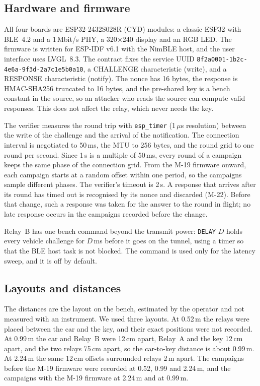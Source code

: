 \documentclass{ieeeaccess}
\begin{document}
\subsection{Hardware and firmware}

All four boards are ESP32-2432S028R (CYD) modules: a classic ESP32 with BLE~4.2 and a 1\,Mbit/s PHY, a 320$\times$240 display and an RGB LED. The firmware is written for ESP-IDF v6.1 with the NimBLE host, and the user interface uses LVGL~8.3. The contract fixes the service UUID \texttt{8f2a0001-1b2c-4e6a-9f3d-2a7c1e5b0a10}, a CHALLENGE characteristic (write), and a RESPONSE characteristic (notify). The nonce has 16 bytes, the response is HMAC-SHA256 truncated to 16 bytes, and the pre-shared key is a bench constant in the source, so an attacker who reads the source can compute valid responses. This does not affect the relay, which never needs the key.

The verifier measures the round trip with \texttt{esp\_timer} (1\,$\mu$s resolution) between the write of the challenge and the arrival of the notification. The connection interval is negotiated to 50\,ms, the MTU to 256 bytes, and the round grid to one round per second. Since 1\,s is a multiple of 50\,ms, every round of a campaign keeps the same phase of the connection grid. From the M-19 firmware onward, each campaign starts at a random offset within one period, so the campaigns sample different phases. The verifier's timeout is 2\,s. A response that arrives after its round has timed out is recognised by its nonce and discarded (M-22). Before that change, such a response was taken for the answer to the round in flight; no late response occurs in the campaigns recorded before the change.

Relay~B has one bench command beyond the transmit power: \texttt{DELAY} $D$ holds every vehicle challenge for $D$\,ms before it goes on the tunnel, using a timer so that the BLE host task is not blocked. The command is used only for the latency sweep, and it is off by default.

\subsection{Layouts and distances}

The distances are the layout on the bench, estimated by the operator and not measured with an instrument. We used three layouts. At 0.52\,m the relays were placed between the car and the key, and their exact positions were not recorded. At 0.99\,m the car and Relay~B were 12\,cm apart, Relay~A and the key 12\,cm apart, and the two relays 75\,cm apart, so the car-to-key distance is about 0.99\,m. At 2.24\,m the same 12\,cm offsets surrounded relays 2\,m apart. The campaigns before the M-19 firmware were recorded at 0.52, 0.99 and 2.24\,m, and the campaigns with the M-19 firmware at 2.24\,m and at 0.99\,m.
\end{document}
